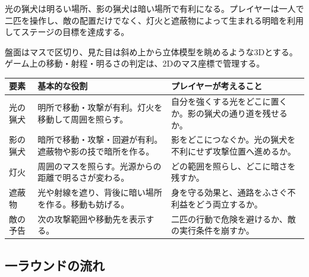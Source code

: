 \documentclass[a4paper,11pt,dvipdfmx]{jsarticle}
\begin{document}
光の猟犬は明るい場所、影の猟犬は暗い場所で有利になる。プレイヤーは一人で二匹を操作し、敵の配置だけでなく、灯火と遮蔽物によって生まれる明暗を利用してステージの目標を達成する。

盤面はマスで区切り、見た目は斜め上から立体模型を眺めるような3Dとする。ゲーム上の移動・射程・明るさの判定は、2Dのマス座標で管理する。

{\small
\begin{longtable}{@{}P{0.20\dimexpr{}\tabcolsep\relax}P{0.34\dimexpr{}\tabcolsep\relax}P{0.46\dimexpr{}\tabcolsep\relax}@{}}
\toprule
\textbf{要素} & \textbf{基本的な役割} & \textbf{プレイヤーが考えること} \\
\midrule
\endhead
光の猟犬 & 明所で移動・攻撃が有利。灯火を移動して周囲を照らす。 & 自分を強くする光をどこに置くか。影の猟犬の通り道を残せるか。 \\
影の猟犬 & 暗所で移動・攻撃・回避が有利。遮蔽物や影の技で暗所を作る。 & 影をどこにつなぐか。光の猟犬を不利にせず攻撃位置へ進めるか。 \\
灯火 & 周囲のマスを照らす。光源からの距離で明るさが変わる。 & どの範囲を照らし、どこに暗さを残すか。 \\
遮蔽物 & 光や射線を遮り、背後に暗い場所を作る。移動も妨げる。 & 身を守る効果と、通路をふさぐ不利益をどう両立するか。 \\
敵の予告 & 次の攻撃範囲や移動先を表示する。 & 二匹の行動で危険を避けるか、敵の実行条件を崩すか。 \\
\bottomrule
\end{longtable}
}

\subsection{一ラウンドの流れ}

\begin{center}
\end{center}
\end{document}
